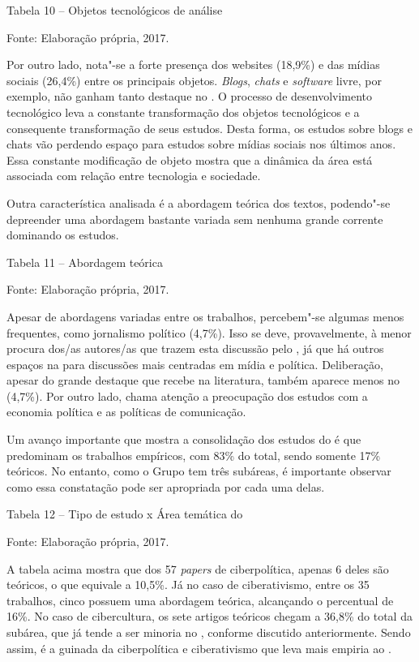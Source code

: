 Tabela 10 -- Objetos tecnológicos de análise


Fonte: Elaboração própria, 2017.

Por outro lado, nota"-se a forte presença dos websites (18,9\%) e das
mídias sociais (26,4\%) entre os principais objetos. \emph{Blogs},
\emph{chats} e \emph{software} livre, por exemplo, não ganham tanto
destaque no . O processo de desenvolvimento tecnológico leva a
constante transformação dos objetos tecnológicos e a consequente
transformação de seus estudos. Desta forma, os estudos sobre blogs e
chats vão perdendo espaço para estudos sobre mídias sociais nos últimos
anos. Essa constante modificação de objeto mostra que a dinâmica da área
está associada com relação entre tecnologia e sociedade.

Outra característica analisada é a abordagem teórica dos textos,
podendo"-se depreender uma abordagem bastante variada sem nenhuma grande
corrente dominando os estudos.

Tabela 11 -- Abordagem teórica

Fonte: Elaboração própria, 2017.

Apesar de abordagens variadas entre os trabalhos, percebem"-se algumas
menos frequentes, como jornalismo político (4,7\%). Isso se deve,
provavelmente, à menor procura dos/as autores/as que trazem esta
discussão pelo , já que há outros espaços na  para discussões
mais centradas em mídia e política. Deliberação, apesar do grande
destaque que recebe na literatura, também aparece menos no  (4,7\%).
Por outro lado, chama atenção a preocupação dos estudos com a economia
política e as políticas de comunicação.

Um avanço importante que mostra a consolidação dos estudos do  é que
predominam os trabalhos empíricos, com 83\% do total, sendo somente 17\%
teóricos. No entanto, como o Grupo tem três subáreas, é importante
observar como essa constatação pode ser apropriada por cada uma delas.

Tabela 12 -- Tipo de estudo x Área temática do 

Fonte: Elaboração própria, 2017.

A tabela acima mostra que dos 57 \emph{papers} de ciberpolítica, apenas
6 deles são teóricos, o que equivale a 10,5\%. Já no caso de
ciberativismo, entre os 35 trabalhos, cinco possuem uma abordagem
teórica, alcançando o percentual de 16\%. No caso de cibercultura, os
sete artigos teóricos chegam a 36,8\% do total da subárea, que já tende
a ser minoria no , conforme discutido anteriormente. Sendo assim, é a
guinada da ciberpolítica e ciberativismo que leva mais empiria ao .

